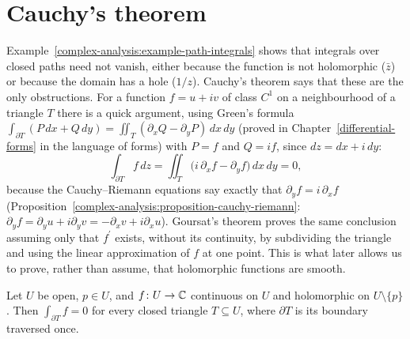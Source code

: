 \section{Cauchy's theorem}\label{complex-analysis:section-cauchy}

Example~\ref{complex-analysis:example-path-integrals} shows that integrals over closed paths need not vanish, either because the function is not holomorphic ($\bar z$) or because the domain has a hole
($1/z$). Cauchy's theorem says that these are the only obstructions. For a function $f = u + iv$ of class $C^1$ on a neighbourhood of a triangle $T$ there is a quick argument, using Green's formula
$\int_{\partial T}(P\,dx + Q\,dy) = \iint_T(\partial_xQ - \partial_yP)\,dx\,dy$ (proved in Chapter~\ref{differential-forms} in the language of forms) with $P = f$ and $Q = if$, since $dz = dx + i\,dy$:
\[
\int_{\partial T}f\,dz = \iint_T\bigl(i\,\partial_xf - \partial_yf\bigr)\,dx\,dy = 0,
\]
because the Cauchy--Riemann equations say exactly that $\partial_yf = i\,\partial_xf$ (Proposition~\ref{complex-analysis:proposition-cauchy-riemann}: $\partial_yf = \partial_yu + i\partial_yv = -\partial_xv + i\partial_xu$).
Goursat's theorem proves the same conclusion assuming only that $f^{\prime}$ exists, without its continuity, by subdividing the triangle and using the linear approximation of $f$ at one point. This is
what later allows us to prove, rather than assume, that holomorphic functions are smooth.

\begin{theorem}[Goursat]\label{complex-analysis:theorem-goursat}
Let $U$ be open, $p \in U$, and $f \colon U \to \mathbb{C}$ continuous on $U$ and holomorphic on $U \setminus \{p\}$. Then $\int_{\partial T}f = 0$ for every closed triangle $T \subseteq U$, where $\partial T$ is its
boundary traversed once.
\end{theorem}

